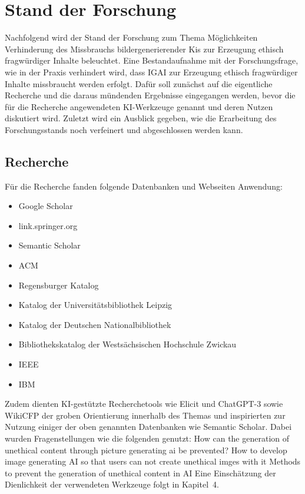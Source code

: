 \section{Stand der Forschung}
Nachfolgend wird der Stand der Forschung zum Thema Möglichkeiten Verhinderung 
des Missbrauchs bildergenerierender Kis zur Erzeugung ethisch fragwürdiger Inhalte beleuchtet. Eine Bestandaufnahme 
mit der Forschungsfrage, wie in der Praxis verhindert wird, dass IGAI zur Erzeugung ethisch fragwürdiger 
Inhalte missbraucht werden erfolgt. Dafür soll zunächst auf die eigentliche Recherche und die daraus mündenden 
Ergebnisse eingegangen werden, bevor die für die Recherche angewendeten KI-Werkzeuge genannt und deren 
Nutzen diskutiert wird. Zuletzt wird ein Ausblick gegeben, wie die Erarbeitung des Forschungsstands noch 
verfeinert und abgeschlossen werden kann.
\subsection{Recherche}
Für die Recherche fanden folgende Datenbanken und Webseiten Anwendung:
\begin{itemize}
    \item Google Scholar
    \item link.springer.org
    \item Semantic Scholar
    \item ACM
    \item Regensburger Katalog
    \item Katalog der Universitätsbibliothek Leipzig
    \item Katalog der Deutschen Nationalbibliothek
    \item Bibliothekskatalog der Westsächsischen Hochschule Zwickau
    \item IEEE
    \item IBM    
\end{itemize}

Zudem dienten KI-gestützte Recherchetools wie Elicit und ChatGPT-3 sowie WikiCFP der groben 
Orientierung innerhalb des Themas und inspirierten zur Nutzung einiger der oben genannten 
Datenbanken wie Semantic Scholar. Dabei wurden Fragenstellungen wie die folgenden genutzt:
How can the generation of unethical content through picture generating ai be prevented?
How to develop image generating AI so that users can not create unethical imges with it
Methods to prevent the generation of unethical content in AI
Eine Einschätzung der Dienlichkeit der verwendeten Werkzeuge folgt in Kapitel 4.
